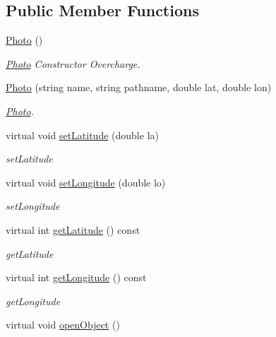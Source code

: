 \subsection*{Public Member Functions}
\begin{DoxyCompactItemize}
\item 
\hypertarget{classPhoto_a10ef03ede9235052eb9f7d5e950f85d3}{\hyperlink{classPhoto_a10ef03ede9235052eb9f7d5e950f85d3}{Photo} ()}\label{classPhoto_a10ef03ede9235052eb9f7d5e950f85d3}

\begin{DoxyCompactList}\small\item\em \hyperlink{classPhoto}{Photo} Constructor Overcharge. \end{DoxyCompactList}\item 
\hyperlink{classPhoto_a6f5de7ca78d5a4b10ce8b5e86c346452}{Photo} (string name, string pathname, double lat, double lon)
\begin{DoxyCompactList}\small\item\em \hyperlink{classPhoto}{Photo}. \end{DoxyCompactList}\item 
virtual void \hyperlink{classPhoto_a2a33bfd34dc606f17f4cb4ff1505afbe}{set\-Latitude} (double la)
\begin{DoxyCompactList}\small\item\em set\-Latitude \end{DoxyCompactList}\item 
virtual void \hyperlink{classPhoto_a5846dcbc510174ed2db5cbbe99367a7f}{set\-Longitude} (double lo)
\begin{DoxyCompactList}\small\item\em set\-Longitude \end{DoxyCompactList}\item 
virtual int \hyperlink{classPhoto_ac96f7a44787994f828e1fb24a4bdf768}{get\-Latitude} () const 
\begin{DoxyCompactList}\small\item\em get\-Latitude \end{DoxyCompactList}\item 
virtual int \hyperlink{classPhoto_a736b26be1028d360f59800512b89b287}{get\-Longitude} () const 
\begin{DoxyCompactList}\small\item\em get\-Longitude \end{DoxyCompactList}\item 
\hypertarget{classPhoto_a37b62ddde8114037efc2f8a8e97d0df0}{virtual void \hyperlink{classPhoto_a37b62ddde8114037efc2f8a8e97d0df0}{open\-Object} ()}\label{classPhoto_a37b62ddde8114037efc2f8a8e97d0df0}


\end{DoxyCompactItemize}
